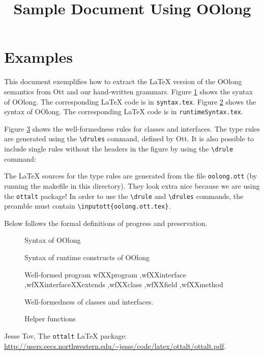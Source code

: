 \documentclass{article}
\title{Sample Document Using OOlong}
\renewcommand{\c}[1]{\texttt{#1}}
\begin{document}
\maketitle

\section{Examples}

This document exemplifies how to extract the \LaTeX{} version of
the OOlong semantics from Ott and our hand-written grammars.
Figure \ref{fig:syntax} shows the syntax of OOlong. The
corresponding \LaTeX{} code is in \texttt{syntax.tex}. Figure
\ref{fig:runtime_syntax} shows the syntax of OOlong. The
corresponding \LaTeX{} code is in \texttt{runtimeSyntax.tex}.

Figure \ref{fig:wf_program} shows the well-formedness rules for
classes and interfaces. The type rules are generated using the
\c{\textbackslash drules} command, defined by Ott. It is also
possible to include single rules without the headers in the
figure by using the \c{\textbackslash drule} command:\medskip

\medskip

\noindent
The \LaTeX{} sources for the type rules are generated from the
file \c{oolong.ott} (by running the makefile in this directory).
They look extra nice because we are using the \c{ottalt}
package\cite{ottalt}! In order to use the \c{\textbackslash drule}
and \c{\textbackslash drules} commands, the preamble must contain
\c{\textbackslash inputott\{oolong.ott.tex\}}.

Below follows the formal definitions of progress and preservation.



\begin{figure}
  \centering
  
  \caption{Syntax of OOlong }
  \label{fig:syntax}
\end{figure}

\begin{figure}
  \centering
  
  \caption{Syntax of runtime constructs of OOlong}
  \label{fig:runtime_syntax}
\end{figure}

\begin{figure}
         {Well-formed program}
         {wfXXprogram
         ,wfXXinterface
         ,wfXXinterfaceXXextends
         ,wfXXclass
         ,wfXXfield
         ,wfXXmethod
       }
\caption{Well-formedness of classes and interfaces. }
  \label{fig:wf_program}
\end{figure}

\begin{figure}
  
  \caption{Helper functions}
  \label{fig:helpers}
\end{figure}

\begin{thebibliography}{}

  Jesse Tov,
  The \c{ottalt} \LaTeX{} package:\\
  \url{http://users.eecs.northwestern.edu/~jesse/code/latex/ottalt/ottalt.pdf}.

\end{thebibliography}
\end{document}
